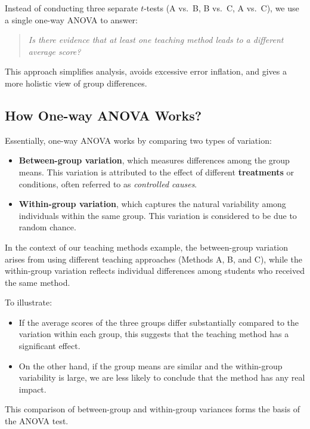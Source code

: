 \documentclass[twoside]{book}
\begin{document}
Instead of conducting three separate $t$-tests (A vs.\ B, B vs.\ C, A vs.\ C), we use a single one-way ANOVA to answer:

\begin{quote}
\textit{Is there evidence that at least one teaching method leads to a different average score?}
\end{quote}

This approach simplifies analysis, avoids excessive error inflation, and gives a more holistic view of group differences.

\subsection{How One-way ANOVA Works?}

\noindent Essentially, one-way ANOVA works by comparing two types of variation:

\begin{itemize}
  \item \textbf{Between-group variation}, which measures differences among the group means. This variation is attributed to the effect of different \textbf{treatments} or conditions, often referred to as \textit{controlled causes}.
  \item \textbf{Within-group variation}, which captures the natural variability among individuals within the same group. This variation is considered to be due to random chance.
\end{itemize}

\noindent In the context of our teaching methods example, the between-group variation arises from using different teaching approaches (Methods A, B, and C), while the within-group variation reflects individual differences among students who received the same method.

\medskip
\noindent To illustrate:
\begin{itemize}
  \item If the average scores of the three groups differ substantially compared to the variation within each group, this suggests that the teaching method has a significant effect.
  \item On the other hand, if the group means are similar and the within-group variability is large, we are less likely to conclude that the method has any real impact.
\end{itemize}

\noindent This comparison of between-group and within-group variances forms the basis of the ANOVA test.
\end{document}
